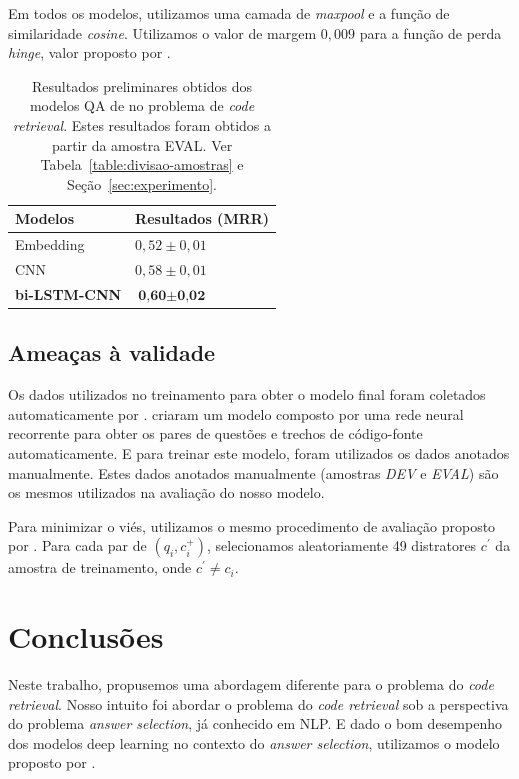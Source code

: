 \documentclass[12pt]{article}
\begin{document}
Em todos os modelos, utilizamos uma camada de \textit{maxpool} e a função de similaridade \textit{cosine}. Utilizamos o valor de margem $0,009$ para a função de perda \textit{hinge}, valor proposto por \cite{feng-answer-selection-2015}.


\begin{table}[h]
\centering
\begin{tabular}{ p{3cm} p{3cm} }
 \hline
 \textbf{Modelos} & \textbf{Resultados (MRR)}\\
 \hline
 Embedding & $0,52 \pm 0,01$\\
 
 CNN & $0,58 \pm 0,01 $ \\
 
 \textbf{bi-LSTM-CNN} & $\textbf{0,60} \pm \textbf{0,02}$\\
 \hline
\end{tabular}
\caption{Resultados preliminares obtidos dos modelos QA de \cite{tan-lstm-qa} no problema de \textit{code retrieval}. Estes resultados foram obtidos a partir da amostra EVAL. Ver Tabela~\ref{table:divisao-amostras} e Seção~\ref{sec:experimento}.}
\label{table:resultados-preliminares}
\end{table}

\subsection{Ameaças à validade}

Os dados utilizados no treinamento para obter o modelo final foram coletados automaticamente por \cite{Yao-staqc:2018}. \cite{Yao-staqc:2018} criaram um modelo composto por uma rede neural recorrente para obter os pares de questões e trechos de código-fonte automaticamente. E para treinar este modelo, foram utilizados os dados anotados manualmente. Estes dados anotados manualmente (amostras \emph{DEV} e \emph{EVAL}) são os mesmos utilizados na avaliação do nosso modelo. 

Para minimizar o viés, utilizamos o mesmo procedimento de avaliação proposto por \cite{iyer-etal-2016-summarizing}. Para cada par de $(q_{i}, c_{i}^{+})$, selecionamos aleatoriamente 49 distratores $c^{'}$ da amostra de treinamento, onde $c^{'} \neq c_{i}$. 

\section{Conclusões}\label{sec:conclusao}

Neste trabalho, propusemos uma abordagem diferente para o problema do \textit{code retrieval}. Nosso intuito foi abordar o problema do \textit{code retrieval} sob a perspectiva do problema \textit{answer selection}, já conhecido em NLP. E dado o bom desempenho dos modelos deep learning no contexto do \textit{answer selection}, utilizamos o modelo proposto por \cite{tan-lstm-qa}.
\end{document}

